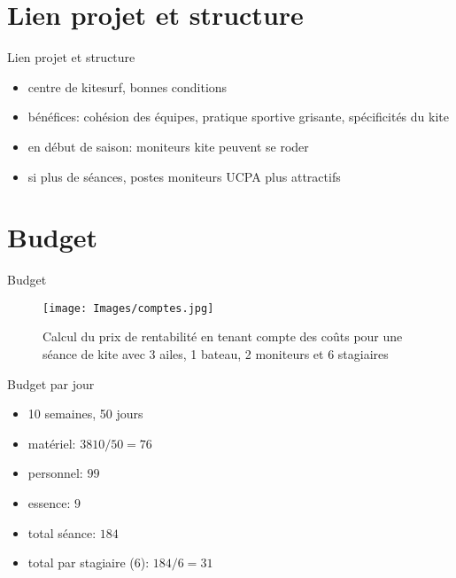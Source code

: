 \documentclass[10pt,a4paper]{beamer}
\begin{document}
\section{Lien projet et structure}
\begin{frame}{Lien projet et structure}
\begin{itemize}
\item  centre de kitesurf, bonnes conditions 
\item bénéfices: cohésion des équipes, pratique sportive grisante, spécificités du kite
\item en début de saison:  moniteurs kite peuvent se roder
\item si plus de séances,  postes moniteurs UCPA plus attractifs
\end{itemize}
\end{frame}

\section{Budget}
\begin{frame}{Budget}
\begin{figure}
\texttt{[image: Images/comptes.jpg]} 
\caption{Calcul du prix de rentabilité en tenant compte
des co\^uts  pour une séance de kite
avec 3 ailes, 1 bateau, 2 moniteurs et 6 stagiaires}
\end{figure}
\end{frame}

\begin{frame}{Budget par jour}
\begin{itemize}
\item 10 semaines, 50 jours
\item matériel: $3810 / 50 = 76$
\item personnel: $99$
\item essence: $9$
\item total séance: $184$
\item total par stagiaire (6): $184/6 = 31$
\end{itemize}
\end{frame}
\end{document}
